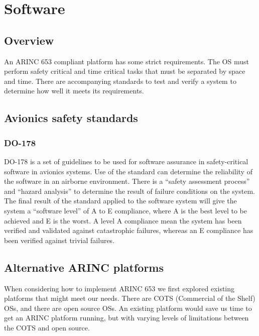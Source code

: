 \section{Software}
\subsection{Overview}
An ARINC 653 compliant platform has some strict requirements.
The OS must perform safety critical and time critical tasks that must be separated by space and time.
There are accompanying standards to test and verify a system to determine how well it meets its requirements.

\subsection{Avionics safety standards}

\subsubsection{DO-178}
DO-178 is a set of guidelines to be used for software assurance in safety-critical software in avionics systems.
Use of the standard can determine the reliability of the software in an airborne environment.
There is a ``safety assessment process'' and ``hazard analysis'' to determine the result of failure conditions on the system.
The final result of the standard applied to the software system will give the system a ``software level'' of A to E compliance,
where A is the best level to be achieved and E is the worst.
A level A compliance mean the system has been verified and validated against catastrophic failures,
whereas an E compliance has been verified against trivial failures.

\subsection{Alternative ARINC platforms}
When considering how to implement ARINC 653 we first explored existing platforms that might meet our needs.
There are COTS (Commercial of the Shelf) OSs, and there are open source OSs.
An existing platform would save us time to get an ARINC platform running,
but with varying levels of limitations between the COTS and open source.

